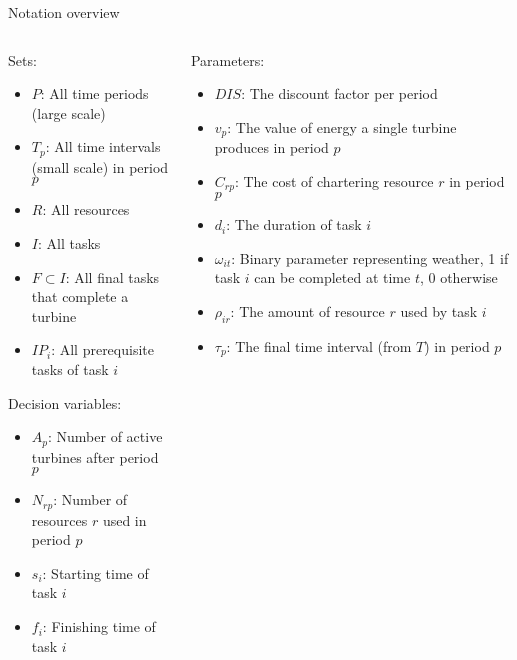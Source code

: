 \documentclass{beamer}
\begin{document}
\begin{frame}{Notation overview}
\footnotesize

\begin{columns}
\begin{column}{.48\textwidth}
Sets:
\begin{itemize}
\item $P$: All time periods (large scale)
\item $T_p$: All time intervals (small scale) in period $p$
\item $R$: All resources
\item $I$: All tasks
\item $F \subset I$: All final tasks that complete a turbine
\item $IP_i$: All prerequisite tasks of task $i$
\end{itemize}

Decision variables:
\begin{itemize}
\item $A_{p}$: Number of active turbines after period $p$
\item $N_{rp}$: Number of resources $r$ used in period $p$
\item $s_i$: Starting time of task $i$
\item $f_i$: Finishing time of task $i$
\end{itemize}
\end{column}

\hfill

\begin{column}{.48\textwidth}
Parameters:
\begin{itemize}
\item $DIS$: The discount factor per period
\item $v_p$: The value of energy a single turbine produces in period $p$
\item $C_{rp}$: The cost of chartering resource $r$ in period $p$
\item $d_i$: The duration of task $i$
\item $\omega_{it}$: Binary parameter representing weather, 1 if task $i$ can be completed at time $t$, 0 otherwise
\item $\rho_{ir}$: The amount of resource $r$ used by task $i$
\item $\tau_p$: The final time interval (from $T$) in period $p$
\end{itemize}
\end{column}
\end{columns}

\end{frame}
\end{document}
